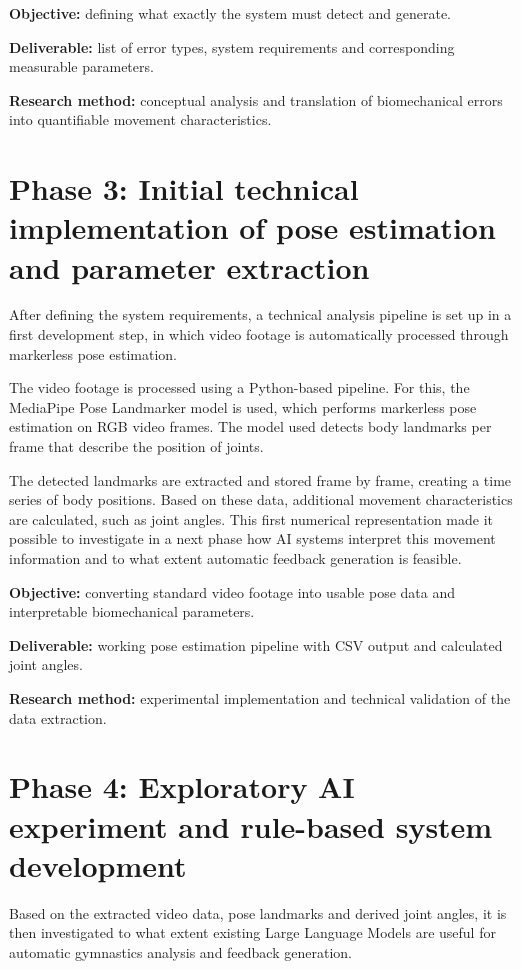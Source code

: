 \textbf{Objective:} defining what exactly the system must detect and generate.  

\textbf{Deliverable:} list of error types, system requirements and corresponding measurable parameters.  

\textbf{Research method:} conceptual analysis and translation of biomechanical errors into quantifiable movement characteristics.

\section{Phase 3: Initial technical implementation of pose estimation and parameter extraction}

After defining the system requirements, a technical analysis pipeline is set up in a first development step, in which video footage is automatically processed through markerless pose estimation.

The video footage is processed using a Python-based pipeline. For this, the MediaPipe Pose Landmarker model is used, which performs markerless pose estimation on RGB video frames. The model used detects body landmarks per frame that describe the position of joints.

The detected landmarks are extracted and stored frame by frame, creating a time series of body positions. Based on these data, additional movement characteristics are calculated, such as joint angles. This first numerical representation made it possible to investigate in a next phase how AI systems interpret this movement information and to what extent automatic feedback generation is feasible.

\textbf{Objective:} converting standard video footage into usable pose data and interpretable biomechanical parameters.  

\textbf{Deliverable:} working pose estimation pipeline with CSV output and calculated joint angles.  

\textbf{Research method:} experimental implementation and technical validation of the data extraction.

\section{Phase 4: Exploratory AI experiment and rule-based system development}

Based on the extracted video data, pose landmarks and derived joint angles, it is then investigated to what extent existing Large Language Models are useful for automatic gymnastics analysis and feedback generation.

